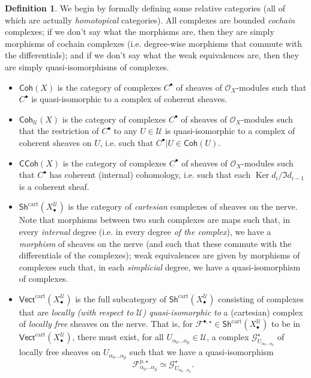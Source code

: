 \documentclass[11pt,fleqn]{article}
\theoremstyle{plain}
\theoremstyle{definition}
\newtheorem{definition}[theorem]{Definition}
\theoremstyle{remark}
\numberwithin{equation}{theorem}
\newcommand{\cover}{\mathcal{U}}
\newcommand{\OO}{\mathcal{O}}
\newcommand{\anotherbullet}{\star}
\newcommand{\gcohX}{\mathsf{Coh}(X)}
\newcommand{\gcohUX}{\mathsf{Coh}_{\cover}(X)}
\newcommand{\gccohX}{\mathsf{CCoh}(X)}
\newcommand{\cartvectX}{\mathsf{Vect}^\mathrm{cart}(X_\bullet^\cover)}
\newcommand{\cartshX}{\mathsf{Sh}^\mathrm{cart}(X_\bullet^\cover)}
\DeclareMathOperator{\Ker}{Ker}
\begin{document}
        \begin{definition}
            We begin by formally defining some relative categories (all of which are actually \emph{homotopical} categories).
            All complexes are bounded \emph{cochain} complexes; if we don't say what the morphisms are, then they are simply morphisms of cochain complexes (i.e. degree-wise morphisms that commute with the differentials); and if we don't say what the weak equivalences are, then they are simply quasi-isomorphisms of complexes.
            \begin{itemize}
                \item $\gcohX$ is the category of complexes $C^\bullet$ of sheaves of $\OO_X$-modules such that $C^\bullet$ is quasi-isomorphic to a complex of coherent sheaves.
                \item $\gcohUX$ is the category of complexes $C^\bullet$ of sheaves of $\OO_X$-modules such that the restriction of $C^\bullet$ to any $U\in\cover$ is quasi-isomorphic to a complex of coherent sheaves on $U$, i.e. such that $C^\bullet|U\in\mathsf{Coh}(U)$.
                \item $\gccohX$ is the category of complexes $C^\bullet$ of sheaves of $\OO_X$-modules such that $C^\bullet$ has coherent (internal) cohomology, i.e. such that each $\Ker d_{i}/\Im d_{i-1}$ is a coherent sheaf.
                \item $\cartshX$ is the category of \emph{cartesian} complexes of sheaves on the nerve.
                    Note that morphisms between two such complexes are maps such that, in every \emph{internal} degree (i.e. in every degree \emph{of the complex}), we have a \emph{morphism} of sheaves on the nerve (and such that these commute with the differentials of the complexes); weak equivalences are given by morphisms of complexes such that, in each \emph{simplicial} degree, we have a quasi-isomorphism of complexes.
                \item $\cartvectX$ is the full subcategory of $\cartshX$ consisting of complexes that are \emph{locally (with respect to $\cover$) quasi-isomorphic to} a (cartesian) complex of \emph{locally free} sheaves on the nerve.
                    That is, for $\mathcal{F}^{\bullet,\anotherbullet}\in\cartshX$ to be in $\cartvectX$, there must exist, for all $U_{\alpha_0\ldots\alpha_p}\in\cover$, a complex $\mathcal{G}_{U_{\alpha_0\ldots\alpha_p}}^{\anotherbullet}$ of locally free sheaves on $U_{\alpha_0\ldots\alpha_p}$ such that we have a quasi-isomorphism
                    \[
                        \mathcal{F}^{p,\anotherbullet}_{\alpha_0\ldots\alpha_p} \simeq \mathcal{G}_{U_{\alpha_0\ldots\alpha_p}}^\anotherbullet.
\]
\end{itemize}
\end{definition}
\end{document}
